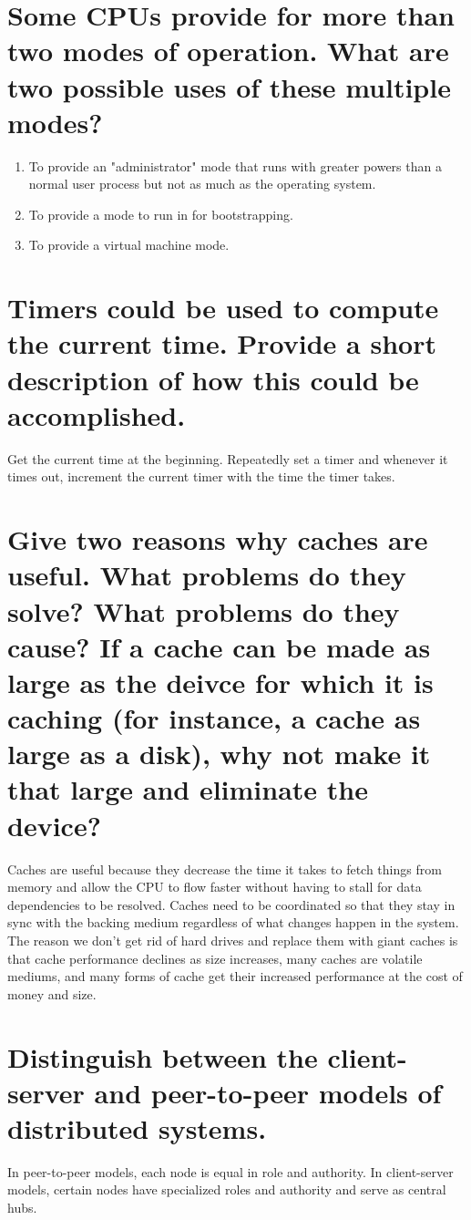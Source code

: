 \documentclass{book}%
\begin{document}
\section{Some CPUs provide for more than two modes of operation. What are two possible uses of these multiple modes?}
\begin{enumerate}
\item To provide an "administrator" mode that runs with greater powers than a normal user process but not as much as the operating system.
\item To provide a mode to run in for bootstrapping.
\item To provide a virtual machine mode.
\end{enumerate}
\section{Timers could be used to compute the current time. Provide a short description of how this could be accomplished.}
Get the current time at the beginning. Repeatedly set a timer and whenever it times out, increment the current timer with the time the timer takes.
\section{Give two reasons why caches are useful. What problems do they solve? What problems do they cause? If a cache can be made as large as the deivce for which it is caching (for instance, a cache as large as a disk), why not make it that large and eliminate the device?}
Caches are useful because they decrease the time it takes to fetch things from memory and allow the CPU to flow faster without having to stall for data dependencies to be resolved. Caches need to be coordinated so that they stay in sync with the backing medium regardless of what changes happen in the system. The reason we don't get rid of hard drives and replace them with giant caches is that cache performance declines as size increases, many caches are volatile mediums, and many forms of cache get their increased performance at the cost of money and size.
\section{Distinguish between the client-server and peer-to-peer models of distributed systems.}
In peer-to-peer models, each node is equal  in role and authority. In client-server models, certain nodes have specialized roles and authority and serve as central hubs.
\end{document}

